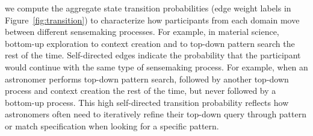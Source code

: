  we compute the aggregate state transition probabilities (edge weight labels in Figure~\ref{fig:transition}) to characterize how participants from each domain move between different sensemaking processes. For example, in material science, bottom-up exploration  to context creation and to top-down pattern search the rest of the time.
 Self-directed edges indicate the probability that the participant
 would continue with the same type of sensemaking process.
 For example, when an astronomer performs top-down pattern search, followed by another top-down process and  context creation the rest of the time,
 but never followed by a bottom-up process.
 This high self-directed transition probability
 reflects how astronomers often need to iteratively
 refine their top-down query through pattern
 or match specification when looking for a specific pattern. %
